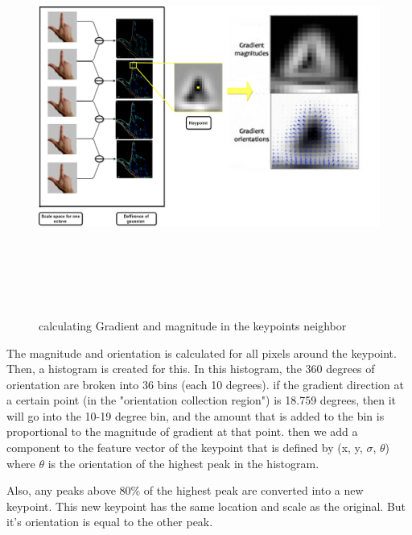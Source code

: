 \begin{figure}[H]
\centering
\includegraphics[width=18.5cm, height=13cm]{img/dog_hand.png}
\caption{ calculating Gradient and magnitude in the keypoints neighbor }
\label{fig:orientation}
\end{figure}



The magnitude and orientation is calculated for all pixels around the keypoint. Then, a histogram is created for this.
In this histogram, the 360 degrees of orientation are broken into 36 bins (each 10 degrees). if  the gradient direction at a certain point (in the "orientation collection region") is 18.759 degrees, then it will go into the 10-19 degree bin, and the amount that is added to the bin is proportional to the magnitude of gradient at that point.
then we add a component to the feature  vector of the keypoint that is  defined by (x, y, $\sigma$, $\theta$) where $\theta$ is the orientation of the highest peak in the histogram.

Also, any peaks above 80\% of the highest peak are converted into a new keypoint. This new keypoint has the same location and scale as the original. But it's orientation is equal to the other peak.

